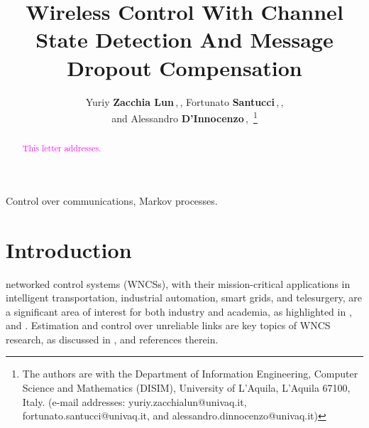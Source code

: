 \documentclass[journal,twoside,web]{ieeecolor}
\title{Wireless Control With Channel State Detection And Message Dropout Compensation}
\author{Yuriy \textbf{Zacchia Lun}\,\textsuperscript{\orcidlink{0000-0002-9408-8773}},\,\IEEEmembership{Member, IEEE}, Fortunato \textbf{Santucci}\,\textsuperscript{\orcidlink{0000-0002-0229-6277}},\,\IEEEmembership{Senior Member, IEEE},\\ and Alessandro \textbf{D'Innocenzo}\,\textsuperscript{\orcidlink{0000-0002-5239-0894}},\,\IEEEmembership{Member, IEEE}
\thanks{The authors are with the 
Department of Information Engineering, Computer Science and Mathematics (DISIM), University of L'Aquila, L'Aquila 67100, Italy. (e-mail addresses:
        {yuriy.zacchialun@univaq.it},\\ {fortunato.santucci@univaq.it}, and {alessandro.dinnocenzo@univaq.it})}%
}
\begin{document}
\maketitle
\thispagestyle{empty}
\pagestyle{empty}

\begin{abstract}
\textcolor{magenta}{This letter addresses.}
\end{abstract}
\begin{keywords}
Control over communications, Markov processes.
\end{keywords}
\section{Introduction}\label{sec:intro}
 networked control systems (WNCSs), with their mission-critical applications in intelligent transportation, industrial automation, smart grids, and telesurgery, are a significant area of interest for both industry and academia, as highlighted in \cite{park2018comm,liu2021iot}, and \cite{pezzutto2024arc}. Estimation and control over unreliable links are key topics of WNCS research, as discussed in \cite{park2018comm,pezzutto2024arc,yZL-2025-automatica}, and references therein. 
\end{document}
